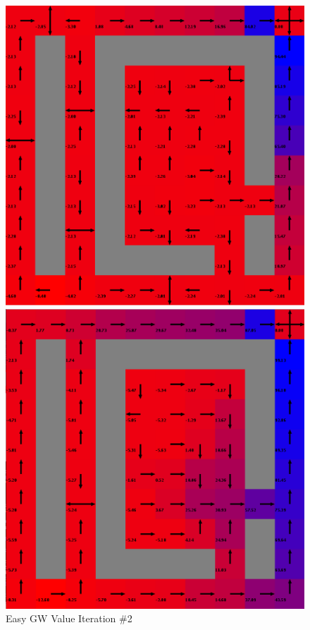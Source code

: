\documentclass[h]{article}
\begin{document}
   \begin{figure}[H]
      \includegraphics[width=1\textwidth,keepaspectratio]{easy-value-2.png} 
      \caption*{Easy GW Value Iteration \#2} 
   \endminipage\hfill
      \includegraphics[width=1\textwidth,keepaspectratio]{easy-value-5.png} 

\end{figure}
\end{document}
